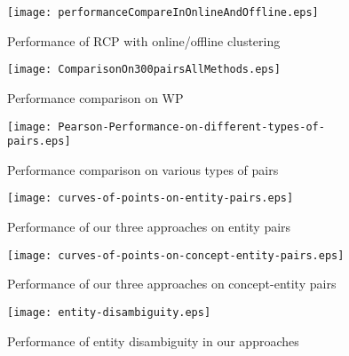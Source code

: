 \begin{figure}[!t]
 \centerline{
 \texttt{[image: performanceCompareInOnlineAndOffline.eps]}}
 \caption{Performance of RCP with online/offline clustering}
 \label{fig:online-offiline}
\end{figure}

\begin{figure}[!t]
 \centerline{
  \texttt{[image: ComparisonOn300pairsAllMethods.eps]}}
 \caption{Performance comparison on WP}
 \label{fig:ComparisonOn300pairsAllMethods}
\end{figure}

\begin{figure}[!t]
 \centerline{
  \texttt{[image: Pearson-Performance-on-different-types-of-pairs.eps]}}
 \caption{Performance comparison on various types of pairs}
 \label{fig:Pearson-Performance-on-different-types-of-pairs}
\end{figure}

\begin{figure*}[!t]
 \centerline{
 \texttt{[image: curves-of-points-on-entity-pairs.eps]}}
 \caption{Performance of our three approaches on entity pairs}
 \label{fig:online-entity-pairs}
\end{figure*}
\begin{figure*}[!t]
 \centerline{
 \texttt{[image: curves-of-points-on-concept-entity-pairs.eps]}}
 \caption{Performance of our three approaches on concept-entity pairs}
 \label{fig:online-concept-entity-pairs}
\end{figure*}

\begin{figure}[th]
 \centerline{
 \texttt{[image: entity-disambiguity.eps]}}
 \caption{Performance of entity disambiguity in our approaches}
 \label{fig:entity-disambiguity}
\end{figure}

